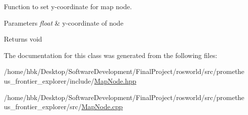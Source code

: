 Function to set y-\/coordinate for map node. 


\begin{DoxyParams}{Parameters}
{\em float} & y-\/coordinate of node\\
\hline
\end{DoxyParams}
\begin{DoxyReturn}{Returns}
void 
\end{DoxyReturn}


The documentation for this class was generated from the following files\+:\begin{DoxyCompactItemize}
\item 
/home/hbk/\+Desktop/\+Software\+Development/\+Final\+Project/rosworld/src/prometheus\+\_\+frontier\+\_\+explorer/include/\hyperlink{MapNode_8hpp}{Map\+Node.\+hpp}\item 
/home/hbk/\+Desktop/\+Software\+Development/\+Final\+Project/rosworld/src/prometheus\+\_\+frontier\+\_\+explorer/src/\hyperlink{MapNode_8cpp}{Map\+Node.\+cpp}\end{DoxyCompactItemize}
